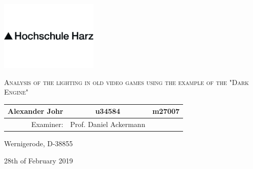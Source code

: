 

\pagestyle{empty}
\clearpage

\newcommand*{\titleUL}{\begingroup%
\begin{center}

\includegraphics[width=0.35\textwidth]{img/hsharz/logo.png}

\LARGE{\textsc{Analysis of the lighting in old video games using the example of the "Dark Engine"}}
\vspace{0.8\baselineskip}

\vfill


\vfill

\normalsize


\begin{tabular}{r c l}
Alexander Johr & u34584 & m27007 \\
\hline
Examiner: &  Prof. Daniel Ackermann & \\
\end{tabular}

  





\vfill

Wernigerode, D-38855

\large 
28th of February 2019

\end{center}

\endgroup}

\titleUL
